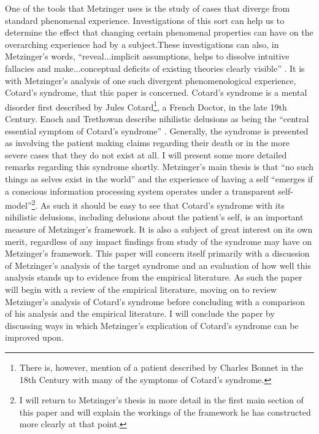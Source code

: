 One of the tools that Metzinger uses is the study of cases that diverge from standard phenomenal experience. Investigations of this sort can help us to determine the effect that changing certain phenomenal properties can have on the overarching experience had by a subject.These investigations can also, in Metzinger’s words, “reveal...implicit assumptions, helps to dissolve intuitive fallacies and make...conceptual deficits of existing theories clearly visible” \cite[p. 213]{metzinger2003}. It is with Metzinger’s analysis of one such divergent phenomenological experience, Cotard’s syndrome, that this paper is concerned.
Cotard’s syndrome is a mental disorder first described by Jules Cotard\footnote{There is, however, mention of a patient described by Charles Bonnet in the 18th Century with many of the symptoms of Cotard’s syndrome\cite{forstl1992}.}, a French Doctor, in the late 19th Century. Enoch and Trethowan describe nihilistic delusions as being the “central essential symptom of Cotard’s syndrome” \cite[p. 172]{enoch1991}. Generally, the syndrome is presented as involving the patient making claims regarding their death or in the more severe cases that they do not exist at all. I will present some more detailed remarks regarding this syndrome shortly.
Metzinger’s main thesis is that “no such things as selves exist in the world” \cite[p. 1]{metzinger2003} and the experience of having a self “emerges if a conscious information processing system operates under a transparent self-model”\footnote{I will return to Metzinger’s thesis in more detail in the first main section of this paper and will explain the workings of the framework he has constructed more clearly at that point.}. As such it should be easy to see that Cotard’s syndrome with its nihilistic delusions, including delusions about the patient’s self, is an important measure of Metzinger’s framework. It is also a subject of great interest on its own merit, regardless of any impact findings from study of the syndrome may have on Metzinger’s framework.
This paper will concern itself primarily with a discussion of Metzinger’s analysis of the target syndrome and an evaluation of how well this analysis stands up to evidence from the empirical literature. As such the paper will begin with a review of the empirical literature, moving on to review Metzinger’s analysis of Cotard’s syndrome before concluding with a comparison of his analysis and the empirical literature. I will conclude the paper by discussing ways in which Metzinger’s explication of Cotard’s syndrome can be improved upon. 

